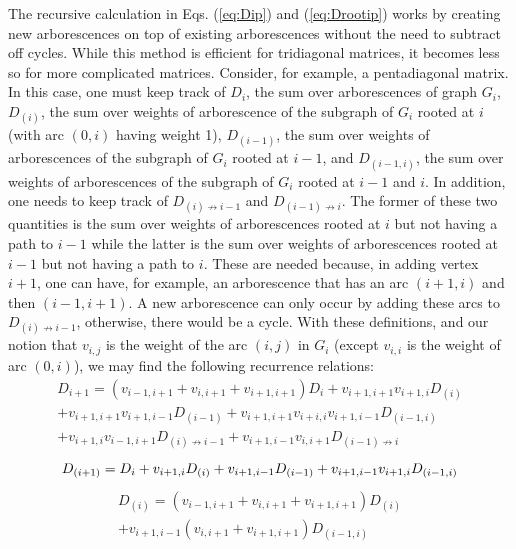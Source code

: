 \documentclass{article}
\begin{document}
The recursive calculation in Eqs. (\ref{eq:Dip}) and (\ref{eq:Drootip}) works by creating new arborescences on top of existing arborescences without the need to subtract off cycles.  While this method is efficient for tridiagonal matrices, it becomes less so for more complicated matrices.  Consider, for example, a pentadiagonal matrix.  In this case, one must keep track of $D_i$, the sum over arborescences of graph $G_i$, $D_{(i)}$, the sum over weights of arborescence of the subgraph of $G_i$ rooted at $i$ (with arc $(0,i)$ having weight 1), $D_{(i-1)}$, the sum over weights of arborescences of the subgraph of $G_i$ rooted at $i-1$, and $D_{(i-1, i)}$, the sum over weights of arborescences of the subgraph of $G_i$ rooted at $i-1$ and $i$.  In addition, one needs to keep track of $D_{(i)\not\to i-1}$ and $D_{(i-1)\not\to i}$.  The former of these two quantities is the sum over weights of arborescences rooted at $i$ but not having a path to $i-1$ while the latter is the sum over weights of arborescences rooted at $i-1$ but not having a path to $i$.  These are needed because, in adding vertex $i+1$, one can have, for example, an arborescence that has an arc $(i+1, i)$ and then $(i-1, i+1)$.  A new arborescence  can only occur by adding these arcs to $D_{(i)\not\to i-1}$, otherwise, there would be a cycle.  With these definitions, and our notion that $v_{i,j}$ is the weight of the arc $(i,j)$ in $G_i$ (except $v_{i,i}$ is the weight of arc $(0,i)$), we may find the following recurrence relations:
\begin{equation}
        \begin{split}
        D_{i+1} = \left(v_{i-1,i+1} + v_{i, i+1} + v_{i+1, i+1}\right) D_i + v_{i+1,i+1} v_{i+1,i} D_{(i)}\\
        + v_{i+1,i+1} v_{i+1, i-1} D_{(i-1)} + v_{i+1, i+1} v_{i+i, i} v_{i+1, i-1} D_{(i-1, i)}\\ + v_{i+1, i} v_{i-1,i+1} D_{(i)\not\to i-1} + v_{i+1, i-1} v_{i, i+1} D_{(i-1)\not\to i} 
        \end{split}
        \label{eq:D_p_i}
\end{equation}
\begin{equation}
    D_{(i+1)} = D_i + v_{i+1,i} D_{(i)} + v_{i+1,i-1} D_{(i-1)}\\ + v_{i+1,i-1} v_{i+1,i} D_{(i-1,i)}
    \label{eq:D_p_p_p}
\end{equation}
\begin{equation}
    \begin{split}
    D_{(i)} = \left(v_{i-1,i+1} + v_{i,i+1} + v_{i+1,i+1}\right)D_{(i)}\\
    + v_{i+1,i-1} \left(v_{i,i+1} + v_{i+1,i+1}\right) D_{(i-1, i)} 
    \end{split}
    \label{eq:D_p_p_i}
\end{equation}
\end{document}
